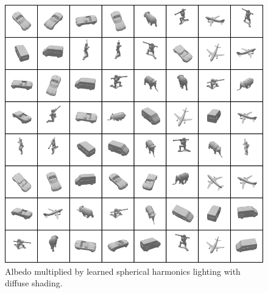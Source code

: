 \documentclass[10pt,twocolumn,letterpaper]{article}
\begin{document}
\begin{figure}[h!]
\centering
\includegraphics[trim={0 0 392px 687px},clip,width=1.0\columnwidth]{./assets/Best_Learned_SH_Image_Training_Data.jpg}
\caption{Albedo multiplied by learned spherical harmonics lighting with diffuse shading.}
\label{fig:SH_and_Albedo}
\end{figure}
\end{document}
